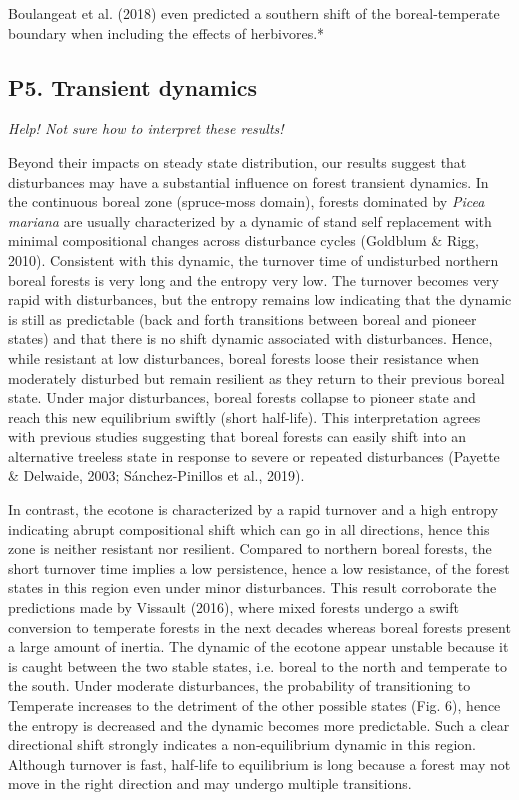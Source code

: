 \documentclass[a4paperpaper,]{article}
\begin{document}
Boulangeat et al. (2018) even predicted a southern shift of the
boreal-temperate boundary when including the effects of herbivores.*

\hypertarget{p5.-transient-dynamics}{%
\subsection{P5. Transient dynamics}\label{p5.-transient-dynamics}}

\emph{Help! Not sure how to interpret these results!}

Beyond their impacts on steady state distribution, our results suggest
that disturbances may have a substantial influence on forest transient
dynamics. In the continuous boreal zone (spruce-moss domain), forests
dominated by \emph{Picea mariana} are usually characterized by a dynamic
of stand self replacement with minimal compositional changes across
disturbance cycles (Goldblum \& Rigg, 2010). Consistent with this
dynamic, the turnover time of undisturbed northern boreal forests is
very long and the entropy very low. The turnover becomes very rapid with
disturbances, but the entropy remains low indicating that the dynamic is
still as predictable (back and forth transitions between boreal and
pioneer states) and that there is no shift dynamic associated with
disturbances. Hence, while resistant at low disturbances, boreal forests
loose their resistance when moderately disturbed but remain resilient as
they return to their previous boreal state. Under major disturbances,
boreal forests collapse to pioneer state and reach this new equilibrium
swiftly (short half-life). This interpretation agrees with previous
studies suggesting that boreal forests can easily shift into an
alternative treeless state in response to severe or repeated
disturbances (Payette \& Delwaide, 2003; Sánchez-Pinillos et al., 2019).

In contrast, the ecotone is characterized by a rapid turnover and a high
entropy indicating abrupt compositional shift which can go in all
directions, hence this zone is neither resistant nor resilient. Compared
to northern boreal forests, the short turnover time implies a low
persistence, hence a low resistance, of the forest states in this region
even under minor disturbances. This result corroborate the predictions
made by Vissault (2016), where mixed forests undergo a swift conversion
to temperate forests in the next decades whereas boreal forests present
a large amount of inertia. The dynamic of the ecotone appear unstable
because it is caught between the two stable states, i.e. boreal to the
north and temperate to the south. Under moderate disturbances, the
probability of transitioning to Temperate increases to the detriment of
the other possible states (Fig. 6), hence the entropy is decreased and
the dynamic becomes more predictable. Such a clear directional shift
strongly indicates a non‐equilibrium dynamic in this region. Although
turnover is fast, half-life to equilibrium is long because a forest may
not move in the right direction and may undergo multiple transitions.
\end{document}

